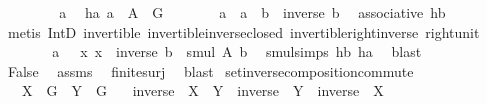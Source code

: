 \begin{isabellebody}
\ \ \isamarkupfalse%
\isanewline
\ \ \ \ \isamarkupfalse%
\ a\ \isamarkupfalse%
\ ha{\isacharcolon}{\kern0pt}\ {\isachardoublequoteopen}a\ {\isasymin}\ A\ {\isasyminter}\ G{\isachardoublequoteclose}\isanewline
\ \ \ \ \isamarkupfalse%
\ \isamarkupfalse%
\ {\isachardoublequoteopen}a\ {\isacharequal}{\kern0pt}\ {\isacharparenleft}{\kern0pt}a\ {\isasymcdot}\ b{\isacharparenright}{\kern0pt}\ {\isasymcdot}\ inverse\ b{\isachardoublequoteclose}\ \isamarkupfalse%
\ associative\ hb\isanewline
\ \ \ \ \ \ \isamarkupfalse%
\ {\isacharparenleft}{\kern0pt}metis\ IntD{}\ invertible\ invertible{\isacharunderscore}{\kern0pt}inverse{\isacharunderscore}{\kern0pt}closed\ invertible{\isacharunderscore}{\kern0pt}right{\isacharunderscore}{\kern0pt}inverse\ right{\isacharunderscore}{\kern0pt}unit{\isacharparenright}{\kern0pt}\isanewline
\ \ \ \ \isamarkupfalse%
\ \isamarkupfalse%
\ {\isachardoublequoteopen}a\ {\isasymin}\ {\isacharparenleft}{\kern0pt}{\isasymlambda}\ x{\isachardot}{\kern0pt}\ x\ {\isasymcdot}\ inverse\ b{\isacharparenright}{\kern0pt}\ {\isacharbackquote}{\kern0pt}\ smul\ A\ {\isacharbraceleft}{\kern0pt}b{\isacharbraceright}{\kern0pt}{\isachardoublequoteclose}\ \isamarkupfalse%
\ smul{\isachardot}{\kern0pt}simps\ hb\ ha\ \isamarkupfalse%
\ blast\isanewline
\ \ \isamarkupfalse%
\isanewline
\ \ \isamarkupfalse%
\ \isamarkupfalse%
\ False\ \isamarkupfalse%
\ assms\ \isamarkupfalse%
\ finite{\isacharunderscore}{\kern0pt}surj\ \isamarkupfalse%
\ blast\isanewline
{}\isamarkupfalse%
%
\endisatagproof
{\isafoldproof}%
%
\isadelimproof
%
\endisadelimproof
%
\isadelimdocument
%
\endisadelimdocument
%
\isatagdocument
%
\isamarkuptrue%
%
\endisatagdocument
{\isafolddocument}%
%
\isadelimdocument
%
\endisadelimdocument
{}\isamarkupfalse%
\ set{\isacharunderscore}{\kern0pt}inverse{\isacharunderscore}{\kern0pt}composition{\isacharunderscore}{\kern0pt}commute{\isacharcolon}{\kern0pt}\isanewline
\ \ \ {\isachardoublequoteopen}X\ {\isasymsubseteq}\ G{\isachardoublequoteclose}\ \ {\isachardoublequoteopen}Y\ {\isasymsubseteq}\ G{\isachardoublequoteclose}\isanewline
\ \ \ {\isachardoublequoteopen}inverse\ {\isacharbackquote}{\kern0pt}\ {\isacharparenleft}{\kern0pt}X\ {\isasymcdots}\ Y{\isacharparenright}{\kern0pt}\ {\isacharequal}{\kern0pt}\ {\isacharparenleft}{\kern0pt}inverse\ {\isacharbackquote}{\kern0pt}\ Y{\isacharparenright}{\kern0pt}\ {\isasymcdots}\ {\isacharparenleft}{\kern0pt}inverse\ {\isacharbackquote}{\kern0pt}\ X{\isacharparenright}{\kern0pt}{\isachardoublequoteclose}\isanewline

\end{isabellebody}

